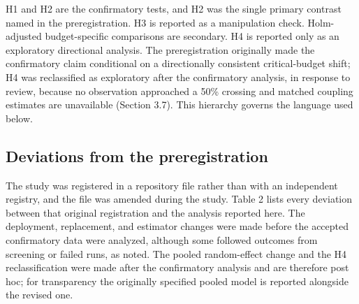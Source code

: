\documentclass[11pt]{article}
\begin{document}
H1 and H2 are the confirmatory tests, and H2 was the single primary contrast named in the preregistration. H3 is reported as a manipulation check. Holm-adjusted budget-specific comparisons are secondary. H4 is reported only as an exploratory directional analysis. The preregistration originally made the confirmatory claim conditional on a directionally consistent critical-budget shift; H4 was reclassified as exploratory after the confirmatory analysis, in response to review, because no observation approached a 50\% crossing and matched coupling estimates are unavailable (Section 3.7). This hierarchy governs the language used below.

\subsection{Deviations from the preregistration}

The study was registered in a repository file rather than with an independent registry, and the file was amended during the study. Table 2 lists every deviation between that original registration and the analysis reported here. The deployment, replacement, and estimator changes were made before the accepted confirmatory data were analyzed, although some followed outcomes from screening or failed runs, as noted. The pooled random-effect change and the H4 reclassification were made after the confirmatory analysis and are therefore post hoc; for transparency the originally specified pooled model is reported alongside the revised one.
\end{document}

